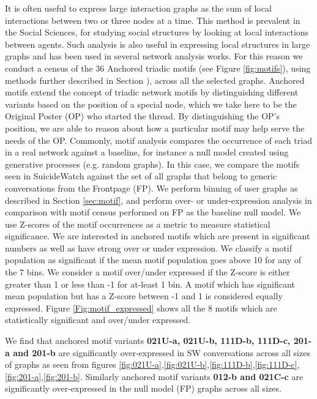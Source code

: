It is often useful to express large interaction graphs as the sum of local interactions between two or three nodes at a time. This method is %
prevalent in the Social Sciences, for studying social structures by looking at local interactions between agents\cite{faust20077}. Such analysis is also useful in expressing local structures in large graphs and has been used in several network analysis works\cite{wang2014triadic,shizuka2015network}.
For this reason we conduct a census of the 36 Anchored triadic motifs (see Figure \ref{fig:motifs}), using methods further described in Section ), across all the selected graphs. Anchored motifs extend the concept of triadic network motifs by distinguishing different variants based on the position of a special node, which we take here to be the Original Poster (OP) who started the thread. By distinguishing the OP's position, we are able to reason about how a particular motif may help serve the needs of the OP. Commonly, motif analysis compares the occurrence of each triad in a real network against a baseline, for instance a null model created using generative processes (e.g. random graphs). In this case, we compare the motifs seen in SuicideWatch against the set of all graphs that belong to generic conversations from the Frontpage (FP).  
We perform binning of user graphs as described in Section \ref{sec:motif}, and perform over- or under-expression analysis in comparison with motif census performed on FP as the baseline null model. We use Z-scores of the motif occurrences as a metric to measure statistical significance. We are interested in anchored motifs which are present in significant numbers as well as have strong over or under expression. We classify a motif population as significant if the mean motif population goes above 10 for any of the 7 bins. We consider a motif over/under expressed if the Z-score is either greater than 1 or less than -1 for at-least 1 bin. A motif which has significant mean population but has a Z-score between -1 and 1 is considered equally expressed. Figure \ref{Fig:motif_expressed} shows all the 8 motifs which are statistically significant and over/under expressed. 

We find that anchored motif variants \textbf{021U-a, 021U-b, 111D-b, 111D-c, 201-a and 201-b} are significantly over-expressed in SW conversations across all sizes of graphs as seen from figures \ref{fig:021U-a},\ref{fig:021U-b},\ref{fig:111D-b},\ref{fig:111D-c}, \ref{fig:201-a},\ref{fig:201-b}. Similarly anchored motif variants \textbf{012-b and 021C-c} are significantly over-expressed in the null model (FP) graphs across all sizes. 

